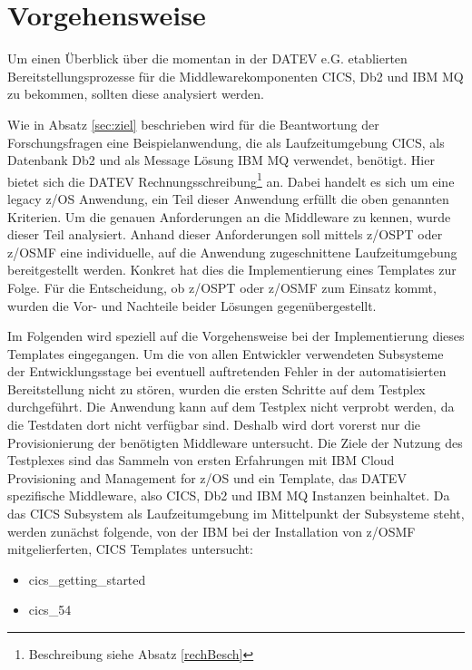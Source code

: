 \chapter{Vorgehensweise}\label{ch:vorgehensweise}
Um einen Überblick über die momentan in der DATEV e.G. etablierten Bereitstellungsprozesse für die Middlewarekomponenten CICS, Db2 und IBM MQ zu bekommen, sollten diese analysiert werden.

Wie in Absatz \ref{sec:ziel} beschrieben wird für die Beantwortung der Forschungsfragen eine Beispielanwendung, die als Laufzeitumgebung CICS, als Datenbank Db2 und als Message Lösung IBM MQ verwendet, benötigt.
Hier bietet sich die \glqq DATEV Rechnungsschreibung\grqq{}\footnote{Beschreibung siehe Absatz \ref{rechBesch}} an.
Dabei handelt es sich um eine legacy z/OS Anwendung, ein Teil dieser Anwendung erfüllt die oben genannten Kriterien.
Um die genauen Anforderungen an die Middleware zu kennen, wurde dieser Teil analysiert.
Anhand dieser Anforderungen soll mittels z/OSPT oder z/OSMF eine individuelle, auf die Anwendung zugeschnittene Laufzeitumgebung bereitgestellt werden.
Konkret hat dies die Implementierung eines Templates zur Folge.
Für die Entscheidung, ob z/OSPT oder z/OSMF zum Einsatz kommt, wurden die Vor- und Nachteile beider Lösungen gegenübergestellt.

Im Folgenden wird speziell auf die Vorgehensweise bei der Implementierung dieses Templates eingegangen.
Um die von allen Entwickler verwendeten Subsysteme der Entwicklungsstage bei eventuell auftretenden Fehler in der automatisierten Bereitstellung nicht zu stören, wurden die ersten Schritte auf dem Testplex durchgeführt.
Die Anwendung kann auf dem Testplex nicht verprobt werden, da die Testdaten dort nicht verfügbar sind.
Deshalb wird dort vorerst nur die Provisionierung der benötigten Middleware untersucht.
Die Ziele der Nutzung des Testplexes sind das Sammeln von ersten Erfahrungen mit \glqq IBM Cloud Provisioning and Management for z/OS\grqq{} und ein Template, das DATEV spezifische Middleware, also CICS, Db2 und IBM MQ Instanzen beinhaltet.
Da das CICS Subsystem als Laufzeitumgebung im Mittelpunkt der Subsysteme steht, werden zunächst folgende, von der IBM bei der Installation von z/OSMF mitgelierferten, CICS Templates untersucht:
\begin{itemize}
\item \glqq cics\_getting\_started\grqq
\item \glqq cics\_54\grqq
\end{itemize}


